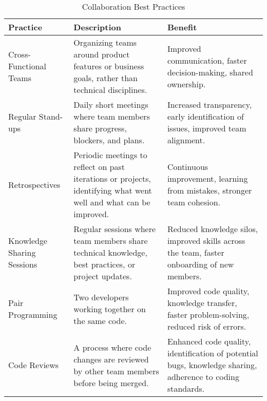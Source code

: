 \begin{longtable}{|p{4cm}|p{8cm}|p{4cm}|}
    \caption{Collaboration Best Practices}
    \label{tab:collaboration_best_practices}                                                                                                                                                                                                                                        \\
    \hline
    \textbf{Practice}               & \textbf{Description}                                                                                                             & \textbf{Benefit}                                                                                           \\
    \hline
    Cross-Functional Teams          & Organizing teams around product features or business goals, rather than technical disciplines.                                   & Improved communication, faster decision-making, shared ownership.                                          \\
    \hline
    Regular Stand-ups               & Daily short meetings where team members share progress, blockers, and plans.                                                     & Increased transparency, early identification of issues, improved team alignment.                           \\
    \hline
    Retrospectives                  & Periodic meetings to reflect on past iterations or projects, identifying what went well and what can be improved.                & Continuous improvement, learning from mistakes, stronger team cohesion.                                    \\
    \hline
    Knowledge Sharing Sessions      & Regular sessions where team members share technical knowledge, best practices, or project updates.                               & Reduced knowledge silos, improved skills across the team, faster onboarding of new members.                \\
    \hline
    Pair Programming                & Two developers working together on the same code.                                                                                & Improved code quality, knowledge transfer, faster problem-solving, reduced risk of errors.                 \\
    \hline
    Code Reviews                    & A process where code changes are reviewed by other team members before being merged.                                             & Enhanced code quality, identification of potential bugs, knowledge sharing, adherence to coding standards. \\

\end{longtable}
